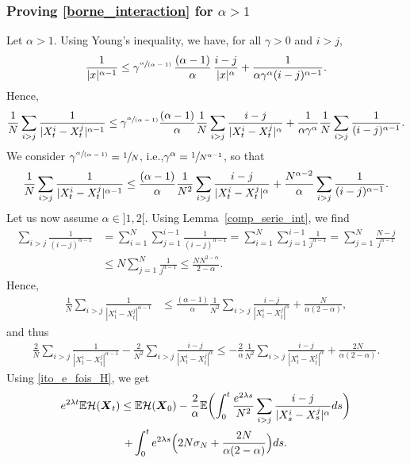 \documentclass[11pt]{article}
\newcommand{\ie}{i.e.,\xspace}
\newcommand{\spfrac}[2]{\sfrac{#1}{(#2)}}
\newcommand{\bX}{{\boldsymbol{X}}}
\theoremstyle{plain}
\theoremstyle{definition}
\begin{document}
\subsubsection*{Proving \eqref{borne_interaction} for $\alpha>1$} Let $\alpha>1$. Using Young's inequality, we have, for all $\gamma>0$ and $i>j$,
\begin{align*}
\frac{1}{|x|^{\alpha-1}}\leq\gamma^{\spfrac{\alpha}{\alpha-1}}\,\frac{(\alpha-1)}{\alpha}\,\frac{i-j}{|x|^{\alpha}}+\frac{1}{\alpha\gamma^\alpha(i-j)^{\alpha-1}}.
\end{align*}
Hence,
\begin{align*}
\frac{1}{N}\sum_{i>j}\frac{1}{|X^i_t-X^j_t|^{\alpha-1}}\leq \gamma^{\spfrac{\alpha}{\alpha-1}}\frac{(\alpha-1)}{\alpha}\frac{1}{N}\sum_{i>j}\frac{i-j}{|X^i_t-X^j_t|^{\alpha}}+\frac{1}{\alpha\gamma^\alpha}\frac{1}{N}\sum_{i>j}\frac{1}{(i-j)^{\alpha-1}}.
\end{align*}
We consider $\gamma^{\spfrac{\alpha}{\alpha-1}}=\sfrac{1}{N}$, \ie $\gamma^{\alpha}=\sfrac{1}{N^{\alpha-1}}$, so that
\begin{equation}\label{controle_serie}
\frac{1}{N}\sum_{i>j}\frac{1}{|X^i_t-X^j_t|^{\alpha-1}}\leq\frac{(\alpha-1)}{\alpha}\frac{1}{N^2}\sum_{i>j}\frac{i-j}{|X^i_t-X^j_t|^{\alpha}}+\frac{N^{\alpha-2}}{\alpha}\sum_{i>j}\frac{1}{(i-j)^{\alpha-1}}.\\
\end{equation}
Let us now assume $\alpha\in{}]1,2[$. Using Lemma~\ref{comp_serie_int}, we find
\begin{align*}
\sum_{i>j}\frac{1}{(i-j)^{\alpha-1}}&=\sum_{i=1}^N\sum_{j=1}^{i-1}\frac{1}{(i-j)^{\alpha-1}}=\sum_{i=1}^N\sum_{j=1}^{i-1}\frac{1}{j^{\alpha-1}}=\sum_{j=1}^N\frac{N-j}{j^{\alpha-1}}\\
&\leq N\sum_{j=1}^N\frac{1}{j^{\alpha-1}}\leq \frac{NN^{2-\alpha}}{2-\alpha}.
\end{align*}
Hence,
\begin{align*}
\frac{1}{N}\sum_{i>j}\frac{1}{|X^i_t-X^j_t|^{\alpha-1}}&\leq \frac{(\alpha-1)}{\alpha}\frac{1}{N^2}\sum_{i>j}\frac{i-j}{|X^i_t-X^j_t|^{\alpha}}+\frac{N}{\alpha(2-\alpha)},
\end{align*}
and thus
\begin{align*}
\frac{2}{N}\sum_{i>j}\frac{1}{|X^i_t-X^j_t|^{\alpha-1}}-\frac{2}{N^2}\sum_{i>j}\frac{i-j}{|X^i_t-X^j_t|^{\alpha}}\leq -\frac{2}{\alpha}\frac{1}{N^2}\sum_{i>j}\frac{i-j}{|X^i_t-X^j_t|^{\alpha}}+\frac{2N}{\alpha(2-\alpha)}.
\end{align*}
Using \eqref{ito_e_fois_H}, we get
\begin{multline}\label{gronwall_H}
e^{2\lambda t}\mathbb{E}\mathcal{H}(\bX_t)\leq \mathbb{E}\mathcal{H}(\bX_0)-\frac{2}{\alpha}\mathbb{E}\biggl(\int_0^t\frac{e^{2\lambda s}}{N^2}\sum_{i>j}\frac{i-j}{|X^i_s-X^j_s|^{\alpha}}ds\biggr)\\
+\int_0^te^{2\lambda s}\Bigl(2N\sigma_N+\frac{2N}{\alpha(2-\alpha)}\Bigr)ds.
\end{multline}
\end{document}
